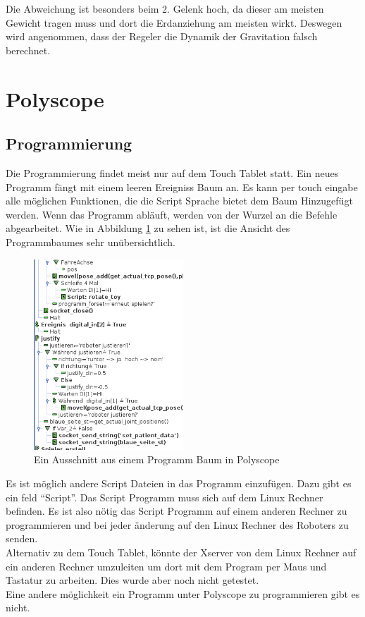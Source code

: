 Die Abweichung ist besonders beim 2. Gelenk hoch, da dieser am meisten Gewicht tragen muss und dort die Erdanziehung am meisten wirkt. Deswegen wird angenommen, dass der Regeler die Dynamik der Gravitation falsch berechnet.

\section{Polyscope}
\label{sec:Polyscope_rel}

\subsection{Programmierung}
\label{sub:programmierung_polyscope_rel}

Die Programmierung findet meist nur auf dem Touch Tablet statt. Ein neues Programm fängt mit einem leeren Ereigniss Baum an. Es kann per touch eingabe alle möglichen Funktionen, die die Script Sprache bietet dem Baum Hinzugefügt werden. Wenn das Programm abläuft, werden von der Wurzel an die Befehle abgearbeitet.
Wie in Abbildung \ref{fig:programm_in_polyscope} zu sehen ist, ist die Ansicht des Programmbaumes sehr unübersichtlich.

\begin{figure}[H]
  \centering
    \includegraphics[width=0.5\textwidth]{pic/polyscope_program_tree.png}
      \caption[Programm Baum in Polyscope]{Ein Ausschnitt aus einem Programm Baum in Polyscope}
      \label{fig:programm_in_polyscope}
\end{figure}

Es ist möglich andere Script Dateien in das Programm einzufügen. Dazu gibt es ein feld ``Script''. Das Script Programm muss sich auf dem Linux Rechner befinden. Es ist also nötig das Script Programm auf einem anderen Rechner zu programmieren und bei jeder änderung auf den Linux Rechner des Roboters zu senden.
\\
Alternativ zu dem Touch Tablet, könnte der Xserver von dem Linux Rechner auf ein anderen Rechner umzuleiten um dort mit dem Program per Maus und Tastatur zu arbeiten. Dies wurde aber noch nicht getestet.
\\
Eine andere möglichkeit ein Programm unter Polyscope zu programmieren gibt es nicht.

